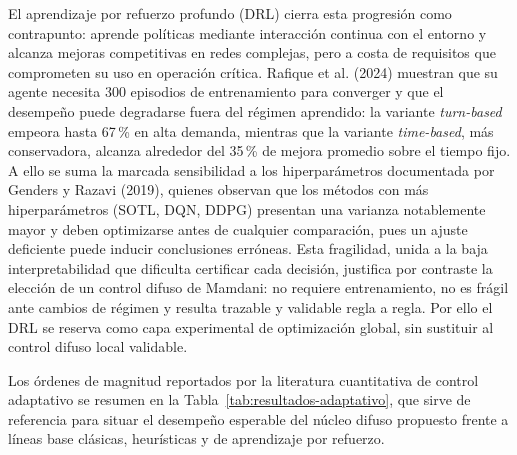 El aprendizaje por refuerzo profundo (DRL) cierra esta progresión como contrapunto: aprende políticas
mediante interacción continua con el entorno y alcanza mejoras competitivas en redes complejas, pero a costa
de requisitos que comprometen su uso en operación crítica. Rafique et al. (2024) muestran que su agente
necesita 300 episodios de entrenamiento para converger y que el desempeño puede degradarse fuera del régimen
aprendido: la variante \emph{turn-based} empeora hasta 67\,\% en alta demanda, mientras que la variante
\emph{time-based}, más conservadora, alcanza alrededor del 35\,\% de mejora promedio sobre el tiempo fijo. A
ello se suma la marcada sensibilidad a los hiperparámetros documentada por Genders y Razavi (2019), quienes
observan que los métodos con más hiperparámetros (SOTL, DQN, DDPG) presentan una varianza notablemente mayor
y deben optimizarse antes de cualquier comparación, pues un ajuste deficiente puede inducir conclusiones
erróneas. Esta fragilidad, unida a la baja interpretabilidad que dificulta certificar cada decisión, justifica
por contraste la elección de un control difuso de Mamdani: no requiere entrenamiento, no es frágil ante
cambios de régimen y resulta trazable y validable regla a regla. Por ello el DRL se reserva como capa
experimental de optimización global, sin sustituir al control difuso local validable.

Los órdenes de magnitud reportados por la literatura cuantitativa de control adaptativo se resumen en la
Tabla~\ref{tab:resultados-adaptativo}, que sirve de referencia para situar el desempeño esperable del núcleo
difuso propuesto frente a líneas base clásicas, heurísticas y de aprendizaje por refuerzo.

